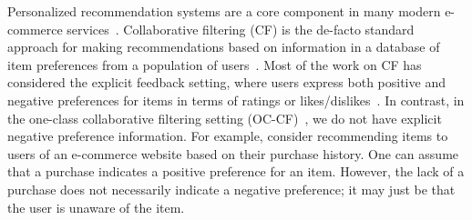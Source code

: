 Personalized recommendation systems are a core component
in many modern e-commerce services~\citep{Leavitt:2006}. Collaborative
filtering (CF) is the de-facto standard approach for making recommendations
based on information in a database
of item preferences from a population of users~\citep{Goldberg:1992, Sarwar:2001}. Most of the work on CF has considered
the explicit feedback
setting, where users express both positive and negative preferences
for items in terms of ratings or likes/dislikes~\citep{koren2009matrix}. In
contrast, in the one-class collaborative filtering setting (OC-CF)~\citep{Pan:2008}, we do not have
explicit negative preference information. For example, consider
recommending items to users of an e-commerce website
based on their purchase history. One can assume that a
purchase indicates a positive preference for an item. However,
the lack of a purchase does not necessarily indicate
a negative preference; it may just be that the user is unaware
of the item.

